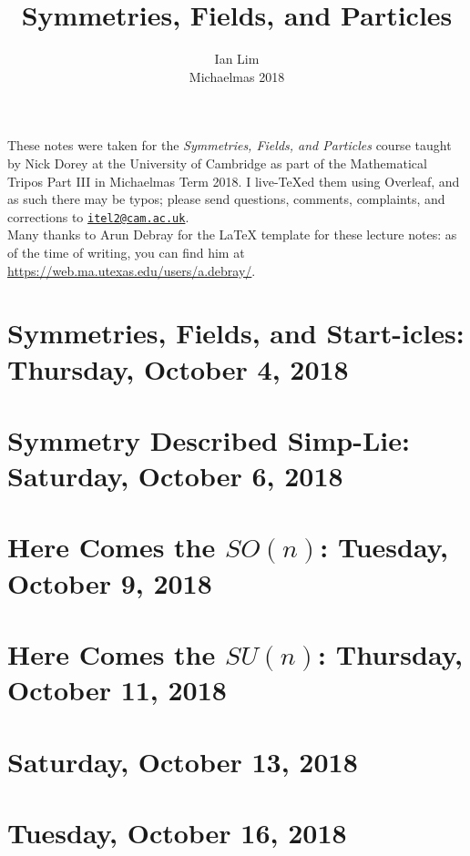\documentclass[reqno]{amsart}
\begin{document}
\title{Symmetries, Fields, and Particles}
\author{Ian Lim\\ Michaelmas 2018}
\maketitle
{\small\noindent These notes were taken for the \textit{Symmetries, Fields, and Particles} course taught by Nick Dorey at the University of Cambridge as part of the Mathematical Tripos Part III in Michaelmas Term 2018. I live-\TeX ed them using Overleaf, and as such there may be typos; please send questions, comments, complaints, and corrections to 
\href{mailto:itel2@cam.ac.uk?subject=SFP\%20Lecture\%20Notes}{\texttt{itel2@cam.ac.uk}}.\\
Many thanks to Arun Debray for the {\LaTeX} template for these lecture notes: as of the time of writing, you can find him at \url{https://web.ma.utexas.edu/users/a.debray/}.}

\tableofcontents

\section{Symmetries, Fields, and Start-icles: Thursday, October 4, 2018}
	
\section{Symmetry Described Simp-Lie: Saturday, October 6, 2018}
	
\section{Here Comes the $SO(n)$: Tuesday, October 9, 2018}
	
\section{Here Comes the $SU(n)$: Thursday, October 11, 2018}
	
\section{Saturday, October 13, 2018}
	
\section{Tuesday, October 16, 2018}
	
\end{document}
